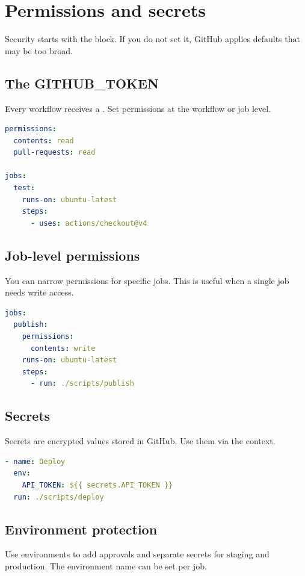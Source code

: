 \chapter{Permissions and secrets}

Security starts with the  block.
If you do not set it, GitHub applies defaults that may be too broad.

\section{The GITHUB\_TOKEN}
Every workflow receives a .
Set permissions at the workflow or job level.

\begin{lstlisting}[language=YAML]
permissions:
  contents: read
  pull-requests: read

jobs:
  test:
    runs-on: ubuntu-latest
    steps:
      - uses: actions/checkout@v4
\end{lstlisting}

\section{Job-level permissions}
You can narrow permissions for specific jobs.
This is useful when a single job needs write access.

\begin{lstlisting}[language=YAML]
jobs:
  publish:
    permissions:
      contents: write
    runs-on: ubuntu-latest
    steps:
      - run: ./scripts/publish
\end{lstlisting}

\section{Secrets}
Secrets are encrypted values stored in GitHub.
Use them via the  context.

\begin{lstlisting}[language=YAML]
- name: Deploy
  env:
    API_TOKEN: ${{ secrets.API_TOKEN }}
  run: ./scripts/deploy
\end{lstlisting}

\section{Environment protection}
Use environments to add approvals and separate secrets for staging and production.
The environment name can be set per job.

